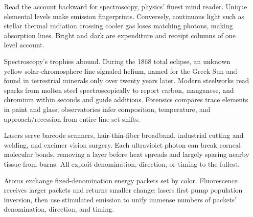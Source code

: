 \begin{mainline}
Read the account backward for spectroscopy, physics' finest mind reader. Unique elemental levels make emission fingerprints. Conversely, continuous light such as stellar thermal radiation crossing cooler gas loses matching photons, making absorption lines. Bright and dark are expenditure and receipt columns of one level account.

Spectroscopy's trophies abound. During the 1868 total eclipse, an unknown yellow solar-chromosphere line signaled helium, named for the Greek Sun and found in terrestrial minerals only over twenty years later. Modern steelworks read sparks from molten steel spectroscopically to report carbon, manganese, and chromium within seconds and guide additions. Forensics compares trace elements in paint and glass; observatories infer composition, temperature, and approach/recession from entire line-set shifts.

Lasers serve barcode scanners, hair-thin-fiber broadband, industrial cutting and welding, and excimer vision surgery. Each ultraviolet photon can break corneal molecular bonds, removing a layer before heat spreads and largely sparing nearby tissue from burns. All exploit denomination, direction, or timing to the fullest.
\end{mainline}


\begin{oneline}
Atoms exchange fixed-denomination energy packets set by color. Fluorescence receives larger packets and returns smaller change; lasers first pump population inversion, then use stimulated emission to unify immense numbers of packets' denomination, direction, and timing.
\end{oneline}


